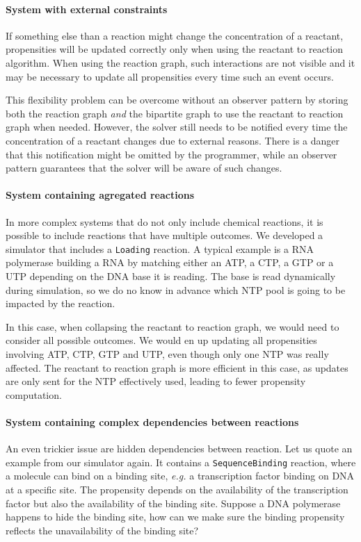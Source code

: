 \paragraph{System with external constraints} If something else than a reaction might change the concentration of a reactant, propensities will be updated correctly only when using the reactant to reaction algorithm. When using the reaction graph, such interactions are not visible and it may be necessary to update all propensities every time such an event occurs.

This flexibility problem can be overcome without an observer pattern by storing both the reaction graph \emph{and} the bipartite graph to use the reactant to reaction graph when needed. However, the solver still needs to be notified every time the concentration of a reactant changes due to external reasons. There is a danger that this notification might be omitted by the programmer, while an observer pattern guarantees that the solver will be aware of such changes.

\paragraph{System containing agregated reactions} In more complex systems that do not only include chemical reactions, it is possible to include reactions that have multiple outcomes. We developed a simulator that includes a \texttt{Loading} reaction. A typical example is a RNA polymerase building a RNA by matching either an ATP, a CTP, a GTP or a UTP depending on the DNA base it is reading. The base is read dynamically during simulation, so we do no know in advance which NTP pool is going to be impacted by the reaction. 

In this case, when collapsing the reactant to reaction graph, we would need to consider all possible outcomes. We would en up updating all propensities involving ATP, CTP, GTP and UTP, even though only one NTP was really affected. The reactant to reaction graph is more efficient in this case, as updates are only sent for the NTP effectively used, leading to fewer propensity computation.

\paragraph{System containing complex dependencies between reactions} An even trickier issue are hidden dependencies between reaction. Let us quote an example from our simulator again. It contains a \texttt{SequenceBinding} reaction, where a molecule can bind on a binding site, \textit{e.g.} a transcription factor binding on DNA at a specific site. The propensity depends on the availability of the transcription factor but also the availability of the binding site. Suppose a DNA polymerase happens to hide the binding site, how can we make sure the binding propensity reflects the unavailability of the binding site?

